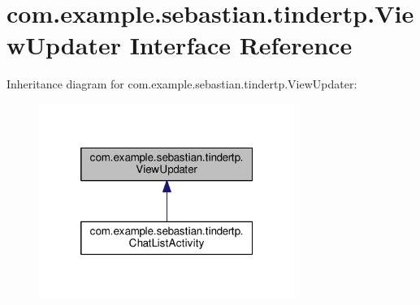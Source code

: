 \hypertarget{interfacecom_1_1example_1_1sebastian_1_1tindertp_1_1ViewUpdater}{}\section{com.\+example.\+sebastian.\+tindertp.\+View\+Updater Interface Reference}
\label{interfacecom_1_1example_1_1sebastian_1_1tindertp_1_1ViewUpdater}


Inheritance diagram for com.\+example.\+sebastian.\+tindertp.\+View\+Updater\+:\nopagebreak
\begin{figure}[H]
\begin{center}
\leavevmode
\includegraphics[width=236pt]{interfacecom_1_1example_1_1sebastian_1_1tindertp_1_1ViewUpdater__inherit__graph}
\end{center}
\end{figure}
